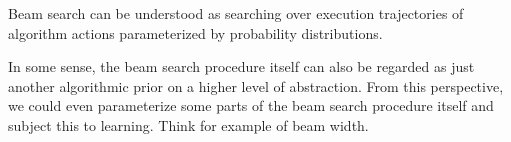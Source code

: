 \documentclass[a4paper]{report}
\theoremstyle{definition}
\theoremstyle{plain}
\newcommand\note[1]{{\color{Navy}\noindent#1}}
\newcommand\smallnote[1]{{\color{Navy}\noindent\scriptsize#1}}
\begin{document}
\note{
Beam search can be understood as searching over execution trajectories of
algorithm actions parameterized by probability distributions.
}

\smallnote{%
In some sense, the beam search procedure itself can also be regarded as just
another algorithmic prior on a higher level of abstraction.
%
From this perspective, we could even parameterize some parts of the beam search
procedure itself and subject this to learning. Think for example of beam width.
}

\printbibliography
\end{document}
